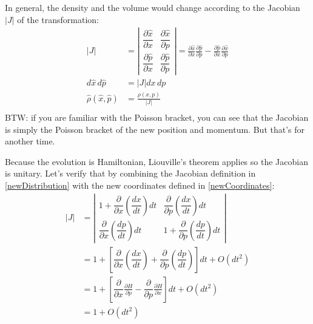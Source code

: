 \documentclass[aps,pra,10pt,floatfix,nofootinbib]{revtex4-1}
\theoremstyle{definition}
\begin{document}
In general, the density and the volume would change according to the Jacobian $|J|$ of the transformation:
\begin{equation}
\begin{aligned}
|J| &= \left| \begin{matrix}
\dfrac{\partial \hat{x}}{\partial x} & \dfrac{\partial \hat{x}}{\partial p} \\[2.2ex]
\dfrac{\partial \hat{p}}{\partial x} & \dfrac{\partial \hat{p}}{\partial p} \end{matrix} \right| = \frac{\partial \hat{x}}{\partial x} \frac{\partial \hat{p}}{\partial p} - \frac{\partial \hat{p}}{\partial x} \frac{\partial \hat{x}}{\partial p}\\
d\hat{x}\,d\hat{p} &= |J| dx \,dp  \\
\hat{\rho}(\hat{x}, \hat{p}) &= \frac{\rho(x, p)}{|J|}  \\
\end{aligned}
\label{newDistribution}
\end{equation}
BTW: if you are familiar with the Poisson bracket, you can see that the Jacobian is simply the Poisson bracket of the new position and momentum. But that's for another time.

Because the evolution is Hamiltonian, Liouville's theorem applies so the Jacobian is unitary. Let's verify that by combining the Jacobian definition in \eqref{newDistribution} with the new coordinates defined in \eqref{newCoordinates}:
\begin{equation}
\begin{aligned}
|J| &= \left| \begin{matrix}
1 + \dfrac{\partial}{\partial x} \left( \dfrac{dx}{dt} \right) dt & \dfrac{\partial}{\partial p} \left( \dfrac{dx}{dt} \right) dt \\[2.2ex]
\dfrac{\partial}{\partial x} \left( \dfrac{dp}{dt} \right) dt & 1 + \dfrac{\partial}{\partial p} \left( \dfrac{dp}{dt} \right) dt \end{matrix} \right| \\
&= 1 + \left[ \dfrac{\partial}{\partial x} \left( \dfrac{dx}{dt} \right) + \dfrac{\partial}{\partial p} \left( \dfrac{dp}{dt} \right) \right] dt + O(dt^2)\\
&= 1 + \left[ \dfrac{\partial}{\partial x} \frac{\partial H}{\partial p} - \dfrac{\partial}{\partial p} \frac{\partial H}{\partial x} \right] dt + O(dt^2)\\
&= 1 + O(dt^2)\\
\end{aligned}
\label{Jacobian}
\end{equation}
\end{document}
